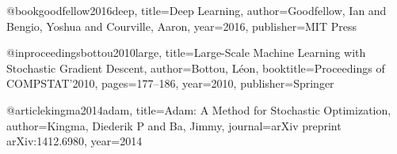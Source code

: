 @book{goodfellow2016deep,
	title={Deep Learning},
	author={Goodfellow, Ian and Bengio, Yoshua and Courville, Aaron},
	year={2016},
	publisher={MIT Press}
}

@inproceedings{bottou2010large,
	title={Large-Scale Machine Learning with Stochastic Gradient Descent},
	author={Bottou, L{\'e}on},
	booktitle={Proceedings of COMPSTAT'2010},
	pages={177--186},
	year={2010},
	publisher={Springer}
}

@article{kingma2014adam,
	title={Adam: A Method for Stochastic Optimization},
	author={Kingma, Diederik P and Ba, Jimmy},
	journal={arXiv preprint arXiv:1412.6980},
	year={2014}
}